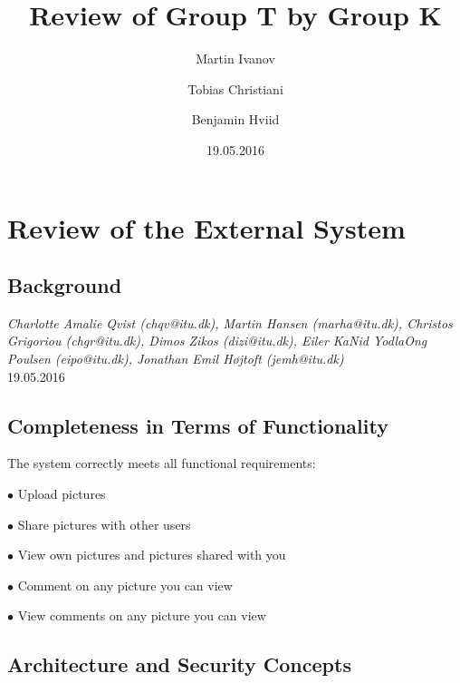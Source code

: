 \documentclass{article}
\title{\huge\sffamily\bfseries Review of Group T by Group K}
\author{ Martin Ivanov \and Tobias Christiani  \and Benjamin Hviid}
\date{19.05.2016}
\begin{document}
\maketitle


\tableofcontents
\pagebreak



\section{Review of the External System}

\subsection{Background}

 {\it Charlotte Amalie Qvist (chqv@itu.dk), Martin Hansen (marha@itu.dk), Christos Grigoriou (chgr@itu.dk), Dimos Zikos (dizi@itu.dk), Eiler KaNid YodlaOng Poulsen (eipo@itu.dk), Jonathan Emil Højtoft (jemh@itu.dk)} \\

 19.05.2016

\subsection{Completeness in Terms of Functionality} 

The system correctly meets all functional requirements:
\begin{description}
    \item $\bullet$ Upload pictures
    \item $\bullet$ Share pictures with other users
    \item $\bullet$ View own pictures and pictures shared with you
    \item $\bullet$ Comment on any picture you can view
    \item $\bullet$ View comments on any picture you can view
\end{description}


\subsection{Architecture and Security Concepts}
\end{document}
